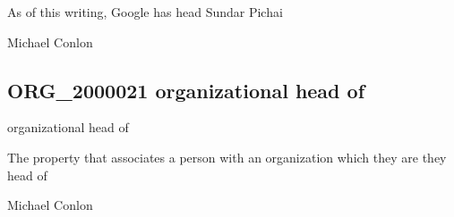 \documentclass[letterpaper,10pt,english]{sphinxmanual}
\begin{document}
\begin{sphinxShadowBox}

\sphinxAtStartPar
As of this writing, Google has head Sundar Pichai
\end{sphinxShadowBox}

\begin{sphinxShadowBox}

\sphinxAtStartPar
{}
\end{sphinxShadowBox}

\begin{sphinxShadowBox}

\sphinxAtStartPar
Michael Conlon 
\end{sphinxShadowBox}
\begin{quote}

\ignorespaces \end{quote}


\subsection{ORG\_2000021 \sphinxhyphen{} organizational head of}
\label{\detokenize{doc-ORG_2000021:org-2000021-organizational-head-of}}\label{\detokenize{doc-ORG_2000021:index-0}}\label{\detokenize{doc-ORG_2000021::doc}}
\begin{sphinxShadowBox}

\sphinxAtStartPar
organizational head of
\end{sphinxShadowBox}

\begin{sphinxShadowBox}

\sphinxAtStartPar
The property that associates a person with an organization which they are they head of
\end{sphinxShadowBox}

\begin{sphinxShadowBox}

\sphinxAtStartPar
Michael Conlon 
\end{sphinxShadowBox}
\end{document}
